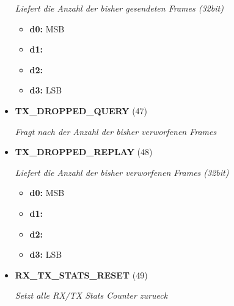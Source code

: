 \begin{itemize}
\textit{Liefert die Anzahl der bisher gesendeten Frames (32bit)}

\small
\begin{itemize}
		
\item \textbf{d0:} MSB
\item \textbf{d1:} 
\item \textbf{d2:} 
\item \textbf{d3:} LSB
\end{itemize}
\normalsize
	
\item \textbf{TX\_DROPPED\_QUERY} (47)

\textit{Fragt nach der Anzahl der bisher verworfenen Frames}

\item \textbf{TX\_DROPPED\_REPLAY} (48)

\textit{Liefert die Anzahl der bisher verworfenen Frames (32bit)}

\small
\begin{itemize}
		
\item \textbf{d0:} MSB
\item \textbf{d1:} 
\item \textbf{d2:} 
\item \textbf{d3:} LSB
\end{itemize}
\normalsize
	
\item \textbf{RX\_TX\_STATS\_RESET} (49)

\textit{Setzt alle RX/TX Stats Counter zurueck}

\end{itemize}
	
